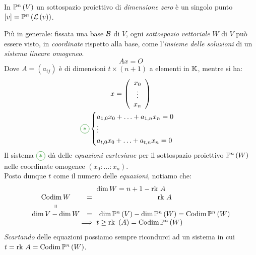 \begin{attention}
	In $\proj{V}$ un sottospazio proiettivo di \textit{dimensione zero} è un singolo punto $\left[v\right]=\proj{\lin{v}}$.
\end{attention}
Più in generale: fissata una base $\mathcal{B}$ di $V$, ogni \textit{sottospazio vettoriale} $W$ di $V$ può essere visto, in \textit{coordinate} rispetto alla base, come l'\textit{insieme delle soluzioni} di un \textit{sistema lineare omogeneo}.
\begin{equation*}
	Ax=O
\end{equation*}
Dove $A=\left(a_{ij}\right)$ è di dimensioni $t\times \left(n+1\right)$ a elementi in $\mathbb{K}$, mentre si ha:
\begin{gather}
	x=\left(\begin{array}{c}
		x_0 \\
		\vdots \\
		x_n
	\end{array}\right)\\
\textcolor{green}{\circled{\ast}}\begin{cases}
	a_{1,0}x_0+\ldots+a_{1,n}x_n=0\\
	\vdots\\
	a_{t,0}x_0+\ldots+a_{t,n}x_n=0\\
\end{cases}
\end{gather}
Il sistema $\textcolor{green}{\circled{\ast}}$ dà delle \textit{equazioni cartesiane} per il sottospazio proiettivo $\proj{W}$ nelle coordinate omogenee $\left(x_0\colon\ldots\colon x_n\right)$.\\
Posto dunque $t$ come il numero delle \textit{equazioni}, notiamo che:
\begin{equation*}
	\begin{array}{cc}
		\dim W=n+1-\rk A \\
\begin{array}{ccc}
	\codim W &=&\rk A \\
	\shortparallel &  \\
	\dim V-\dim W &=&\dim\proj{V}-\dim\proj{W}=\codim\proj{W}
\end{array}\\
	\implies t\geq \rk\left(A\right)=\codim\proj{W}
	\end{array}
\end{equation*}
\textit{Scartando} delle equazioni possiamo sempre ricondurci ad un sistema in cui $t=\rk A=\codim\proj{W}$.
